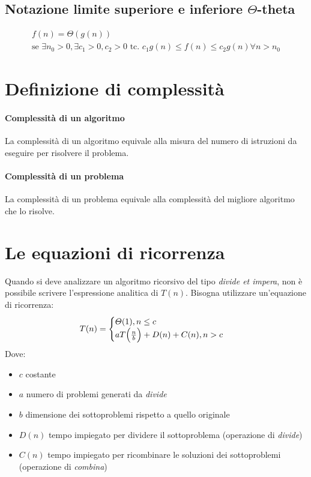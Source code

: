 \subsection*{Notazione limite superiore e inferiore $\varTheta$-theta}
\begin{gather*}
f(n)=\varTheta(g(n))\\
\text{se } \exists n_0 >0, \exists c_1>0,c_2>0 \text{ tc. } c_1g(n)\leq f(n)\leq c_2 g(n) \forall n>n_0
\end{gather*}

\section{Definizione di complessità}

\paragraph{Complessità di un algoritmo} La complessità di un algoritmo equivale alla misura del numero di istruzioni da eseguire per risolvere il problema.

\paragraph{Complessità di un problema} La complessità di un problema equivale alla complessità del migliore algoritmo che lo risolve.

\section{Le equazioni di ricorrenza}
Quando si deve analizzare un algoritmo ricorsivo del tipo \textit{divide et impera}, non è possibile scrivere l'espressione analitica di $T(n)$. Bisogna utilizzare un'equazione di ricorrenza:
\begin{equation*}
T(n) = 
\begin{cases}
\varTheta(1), n\le c\\
aT\Bigl(\frac{n}{b}\Bigr)+D(n)+C(n), n>c
\end{cases}
\end{equation*}
Dove:
\begin{itemize}[noitemsep, nolistsep]
	\item $c$ costante
	\item $a$ numero di problemi generati da \textit{divide}
	\item $b$ dimensione dei sottoproblemi rispetto a quello originale
	\item $D(n)$ tempo impiegato per dividere il sottoproblema (operazione di \textit{divide})
	\item $C(n)$ tempo impiegato per ricombinare le soluzioni dei sottoproblemi (operazione di \textit{combina})
\end{itemize}

